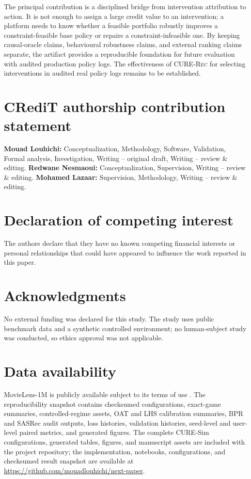 \documentclass[review]{elsarticle}
\theoremstyle{plain}
\theoremstyle{definition}
\theoremstyle{remark}
\newcommand{\CURE}{\textsc{CURE-Rec}}
\begin{document}
The principal contribution is a disciplined bridge from intervention attribution to action. It is not enough to assign a large credit value to an intervention; a platform needs to know whether a feasible portfolio robustly improves a constraint-feasible base policy or repairs a constraint-infeasible one. By keeping causal-oracle claims, behavioural robustness claims, and external ranking claims separate, the artifact provides a reproducible foundation for future evaluation with audited production policy logs. The effectiveness of \CURE{} for selecting interventions in audited real policy logs remains to be established.

\section*{CRediT authorship contribution statement}
\textbf{Mouad Louhichi:} Conceptualization, Methodology, Software, Validation, Formal analysis, Investigation, Writing -- original draft, Writing -- review \& editing.
\textbf{Redwane Nesmaoui:} Conceptualization, Supervision, Writing -- review \& editing.
\textbf{Mohamed Lazaar:} Supervision, Methodology, Writing -- review \& editing.

\section*{Declaration of competing interest}
The authors declare that they have no known competing financial interests or personal relationships that could have appeared to influence the work reported in this paper.

\section*{Acknowledgments}
No external funding was declared for this study. The study uses public benchmark data and a synthetic controlled environment; no human-subject study was conducted, so ethics approval was not applicable.

\section*{Data availability}
MovieLens-1M is publicly available subject to its terms of use \cite{harper2015movielens}. The reproducibility snapshot contains checksumed configurations, exact-game summaries, controlled-regime assets, OAT and LHS calibration summaries, BPR and SASRec audit outputs, loss histories, validation histories, seed-level and user-level paired metrics, and generated figures. The complete CURE-Sim configurations, generated tables, figures, and manuscript assets are included with the project repository; the implementation, notebooks, configurations, and checksumed result snapshot are available at \url{https://github.com/mouadlouhichi/next-paper}.
\end{document}

